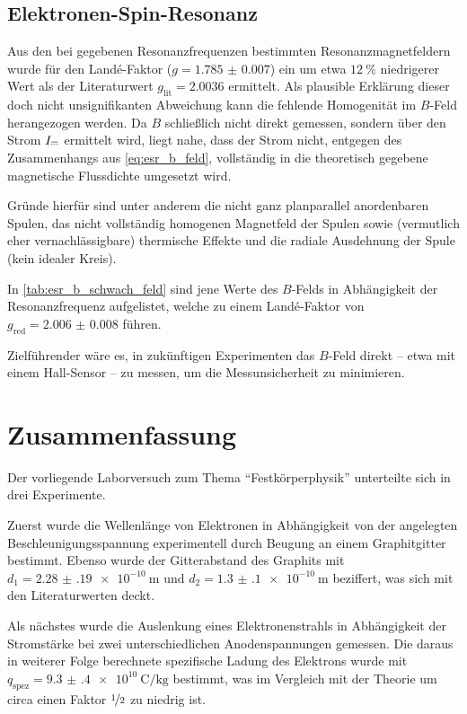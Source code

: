 \documentclass[ngerman]{scrartcl}
\newcommand{\mathdirectcurrent}{\mathrel{\mathpalette\mathdirectcurrentinner\relax}}
\newcommand{\mathdirectcurrentinner}[2]{%
  \settowidth{\dimen0}{$#1=$}%
  \vbox to .85ex {\offinterlineskip
    \hbox to \dimen0{\hss\leaders\hrule\hskip.85\dimen0\hss}
    \vskip.35ex
    \hbox to \dimen0{\hss
      \leaders\hrule\hskip.17\dimen0
      \hskip.17\dimen0
      \leaders\hrule\hskip.17\dimen0
      \hskip.17\dimen0
      \leaders\hrule\hskip.17\dimen0
    \hss}
    \vfill
  }%
}
\begin{document}
\subsection{Elektronen-Spin-Resonanz}
\label{subsec:diskussion_esr}

Aus den bei gegebenen Resonanzfrequenzen bestimmten Resonanzmagnetfeldern wurde für den Landé-Faktor ($g = \num{1.785(7)}$) ein um etwa $\SI{12}{\percent}$ niedrigerer Wert als der Literaturwert $g_{\text{lit}} = \num{2,0036}$ \cite{ref:angabe_esr} ermittelt.
Als plausible Erklärung dieser doch nicht unsignifikanten Abweichung kann die fehlende Homogenität im $B$-Feld herangezogen werden. Da $B$ schließlich nicht direkt gemessen, sondern über den Strom $I_{\mathdirectcurrent{}}$ ermittelt wird, liegt nahe, dass der Strom nicht, entgegen des Zusammenhangs aus \autoref{eq:esr_b_feld}, vollständig in die theoretisch gegebene magnetische Flussdichte umgesetzt wird.

Gründe hierfür sind unter anderem die nicht ganz planparallel anordenbaren Spulen, das nicht vollständig homogenen Magnetfeld der Spulen sowie (vermutlich eher vernachlässigbare) thermische Effekte und die radiale Ausdehnung der Spule (kein idealer Kreis).

In \autoref{tab:esr_b_schwach_feld} sind jene Werte des $B$-Felds in Abhängigkeit der Resonanzfrequenz aufgelistet, welche zu einem Landé-Faktor von $g_{\text{red}} = \num{2.006(8)}$ führen.

Zielführender wäre es, in zukünftigen Experimenten das $B$-Feld direkt -- etwa mit einem Hall-Sensor -- zu messen, um die Messunsicherheit zu minimieren.



\section{Zusammenfassung}
\label{sec:zusammenfassung}

Der vorliegende Laborversuch zum Thema \enquote{Festkörperphysik} unterteilte sich in drei Experimente.

Zuerst wurde die Wellenlänge von Elektronen in Abhängigkeit von der angelegten Beschleunigungsspannung experimentell durch Beugung an einem Graphitgitter bestimmt. Ebenso wurde der Gitterabstand des Graphits mit $d_1 = \SI{2.28(19)e-10}{\meter}$ und $d_2 = \SI{1.3(1)e-10}{\meter}$ beziffert, was sich mit den Literaturwerten deckt.

Als nächstes wurde die Auslenkung eines Elektronenstrahls in Abhängigkeit der Stromstärke bei zwei unterschiedlichen Anodenspannungen gemessen. Die daraus in weiterer Folge berechnete spezifische Ladung des Elektrons wurde mit $q_{\text{spez}} = \SI{9.3(4)e10}{\coulomb\per\kilo\gram}$ bestimmt, was im Vergleich mit der Theorie um circa einen Faktor $\nicefrac{1}{2}$ zu niedrig ist.
\end{document}
